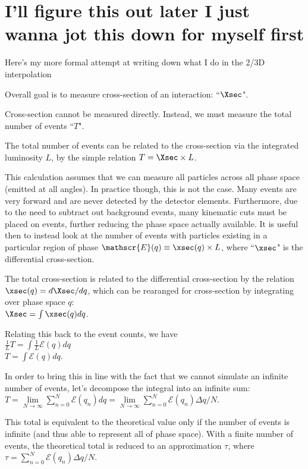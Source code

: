 \section{I'll figure this out later I just wanna jot this down for myself first}

    Here's my more formal attempt at writing down what I do in the 2/3D interpolation

    Overall goal is to measure cross-section of an interaction: ``$\Xsec$".

    Cross-section cannot be measured directly. Instead, we must measure the total number of events ``$T$". 

    The total number of events can be related to the cross-section via the integrated luminosity $L$, by the simple relation $T = \Xsec \times L$.

    This calculation assumes that we can measure all particles across all phase space (emitted at all angles). In practice though, this is not the case.
    Many events are very forward and are never detected by the detector elements.
    Furthermore, due to the need to subtract out background events, many kinematic cuts must be placed on events, further reducing the phase space actually available.
    It is useful then to instead look at the number of events with particles existing in a particular region of phase $\mathscr{E} (q) \equiv \xsec (q) \times L$, where ``$\xsec$" is the differential cross-section.

    The total cross-section is related to the differential cross-section by the relation \\
    $\xsec (q) = d \Xsec / d q$, which can be rearanged for cross-section by integrating over phase space $q$: \\
    $\Xsec = \int \xsec (q) d q$.

    Relating this back to the event counts, we have\\
    $\frac{1}{L} T = \int \frac{1}{L} \mathscr{E} (q) dq $ \\
    $T = \int \mathscr{E} (q) dq $.

    In order to bring this in line with the fact that we cannot simulate an infinite number of events, let's decompose the integral into an infinite sum:\\
    $T = \lim\limits_{N\to\infty} \sum\limits_{n=0}^{N} \mathscr{E}(q_n) dq = \lim\limits_{N\to\infty} \sum\limits_{n=0}^{N} \mathscr{E}(q_n) \Delta q / N $.

    This total is equivalent to the theoretical value only if the number of events is infinite (and thus able to represent all of phase space).
    With a finite number of events, the theoretical total is reduced to an approximation $\tau$, where\\
    $\tau = \sum\limits_{n=0}^{N} \mathscr{E}(q_n) \Delta q / N $.

